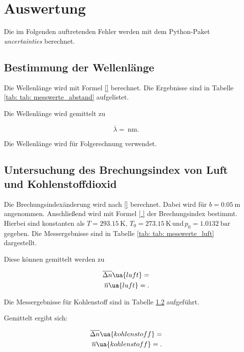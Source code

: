 \section{Auswertung}

Die im Folgenden auftretenden Fehler werden mit dem
Python-Paket \emph{uncertainties}\cite{uncertainties} berechnet.

\subsection{Bestimmung der Wellenlänge}

Die Wellenlänge wird mit Formel \eqref{} berechnet.
Die Ergebnisse sind in Tabelle \ref{tab: tab: messwerte_abstand} aufgelistet.


Die Wellenlänge wird gemittelt zu

\begin{equation}
  \label{eq:wellenlaenge}
  \overline{\lambda}=\SI{}{\nano\meter}.
\end{equation}

Die Wellenlänge wird für Folgerechnung verwendet.

\subsection{Untersuchung des Brechungsindex von Luft und Kohlenstoffdioxid}

Die Brechungsindexänderung wird nach \eqref{} berechnet. Dabei wird
für $b=\SI{0.05}{\meter}$ angenommen. Anschließend wird mit Formel \eqref{
} der Brechungsindex bestimmt. Hierbei sind konstanten als $T=\SI{293.15}{\kelvin},\, T_0=\SI{273.15}{\kelvin} \,
\text{und} \, p_0=\SI{1.0132}{\bar}$ gegeben. Die Messergebnisse sind in Tabelle \ref{tab: tab: messwerte_luft}
dargestellt.

Diese können gemittelt werden zu

\begin{align}
  \label{eq:mittelwerte_luft}
  \begin{aligned}
    \overline{\Delta n}\ua{luft}=\num{}\\
    \overline{n}\ua{luft}=\num{}.
  \end{aligned}
\end{align}

Die Messergebnisse für Kohlenstoff sind in Tabelle \ref{} aufgeführt.


Gemittelt ergibt sich:

\begin{align}
  \label{eq:mittelwerte_kohlenstoff}
  \begin{aligned}
    \overline{\Delta n}\ua{kohlenstoff}=\num{}\\
    \overline{n}\ua{kohlenstoff}=\num{}.
  \end{aligned}
\end{align}

